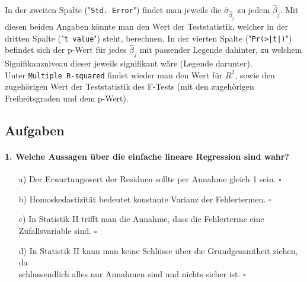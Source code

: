 \documentclass[a4paper]{article}
\begin{document}
\noindent In der zweiten Spalte ("\texttt{Std. Error}") findet man jeweils die $\hat \sigma_{\hat \beta_j}$ zu jedem $\hat \beta_j$. Mit diesen beiden Angaben könnte man den Wert der Teststatistik, welcher in der dritten Spalte ("\texttt{t value}") steht, berechnen. In der vierten Spalte ("\texttt{Pr(>|t|)}") befindet sich der p-Wert für jedes $\hat \beta_j$ mit passender Legende dahinter, zu welchem Signifikanzniveau dieser jeweils signifikant wäre (Legende darunter).\\
Unter \texttt{Multiple R-squared} findet wieder man den Wert für $R^2$, sowie den zugehörigen Wert der Teststatistik des F-Tests (mit den zugehörigen Freiheitsgraden und dem p-Wert).\\

\noindent {}

\clearpage

\subsection{Aufgaben}
\paragraph{1. Welche Aussagen über die einfache lineare Regression sind wahr?}
\begin{itemize}
    \item[a)] Der Erwartungswert der Residuen sollte per Annahme gleich 1 sein. \hfill $\square$
    \item[b)] Homoskedastizität bedeutet konstante Varianz der Fehlertermen. \hfill $\square$
    \item[c)] In Statistik II trifft man die Annahme, dass die Fehlerterme eine Zufallsvariable sind. \hfill $\square$
    \item[d)] In Statistik II kann man keine Schlüsse über die Grundgesamtheit ziehen, da\\ schlussendlich alles nur Annahmen sind und nichts sicher ist. \hfill $\square$
\end{itemize}
\end{document}
